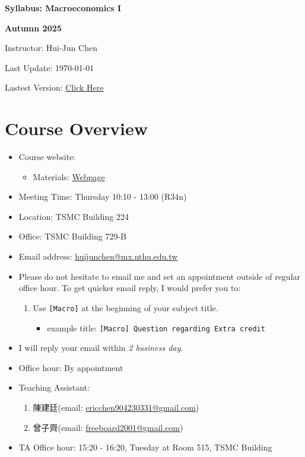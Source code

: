 \documentclass[12pt]{article}
\begin{document}
\centerline{\huge\bf Syllabus: Macroeconomics I}
\medskip
\centerline{\LARGE \bf Autumn 2025}
\medskip
\centerline{\Large Instructor: Hui-Jun Chen}
\centerline{Last Update: \today}
\centerline{Lastest Version: \href{https://huijunchen9260.github.io/pdf/MacroeconomicsIAutumn2025/syllabus/syllabus.pdf}{Click Here}}

\medskip



\section*{Course Overview}
\begin{itemize}

    \item Course website:
    \begin{itemize}
        \item Materials: \href{https://huijunchen9260.github.io/MacroeconomicsIAutumn2025.html}{Webpage}
    \end{itemize}
    \item Meeting Time: Thursday 10:10 - 13:00 (R34n)
    \item Location: TSMC Building 224
    \item Office: TSMC Building 729-B
    \item Email address: \href{huijunchen@mx.nthu.edu.tw}{huijunchen@mx.nthu.edu.tw}
    \item Please do not hesitate to email me and set an appointment outside of regular office hour. To get quicker email reply, I would prefer you to:
    \begin{enumerate}
        \item Use \texttt{[Macro]} at the beginning of your subject title.
        \begin{itemize}
            \item example title: \texttt{[Macro] Question regarding Extra credit}
        \end{itemize}
    \end{enumerate}
    \item I will reply your email within \textit{2 business day}.
    \item Office hour: By appointment
    \item Teaching Assistant:
    \begin{enumerate}
        \item 陳建廷(email: \href{ericchen904230331@gmail.com}{ericchen904230331@gmail.com})
        \item 曾子齊(email: \href{freeboard2001@gmail.com}{freeboard2001@gmail.com})
    \end{enumerate}
    \item TA Office hour: 15:20 - 16:20, Tuesday at Room 515, TSMC Building
\end{itemize}
\end{document}
